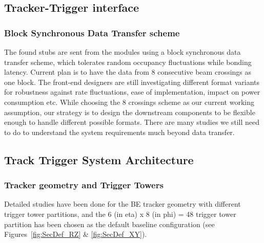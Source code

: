 \subsection{Tracker-Trigger interface}

\subsubsection{Block Synchronous Data Transfer scheme }

\noindent The found stubs are sent from the modules using a block synchronous data transfer scheme, which tolerates random occupancy fluctuations while bonding latency. Current plan is to have the data from 8 consecutive beam crossings as one block. The front-end designers are still investigating different format variants for robustness against rate fluctuations, ease of implementation, impact on power consumption etc. While choosing the 8 crossings scheme as our current working assumption, our strategy is to design the downstream components to be flexible enough to handle different possible formats. There are many studies we still need to do to understand the system requirements much beyond data transfer. 

\subsection{Track Trigger System Architecture}

\subsubsection{Tracker geometry and Trigger Towers }

\noindent Detailed studies have been done for the BE tracker geometry with different trigger tower partitions, and the 6 (in eta) x 8 (in phi) = 48 trigger tower partition has been chosen as the default baseline configuration (see Figures~\ref{fig:SecDef_RZ} \& \ref{fig:SecDef_XY}).

